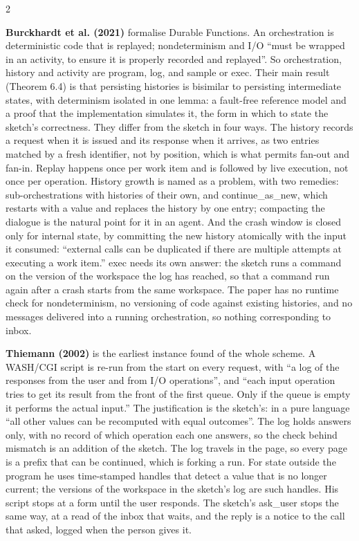 \documentclass{article}
\newcommand{\paper}[1]{\par\smallskip\textbf{#1}\quad}
\newcommand{\cd}[1]{{\ttfamily #1}}
\begin{document}
\begin{multicols}{2}
\paper{Burckhardt et al. (2021)} formalise Durable Functions. An orchestration is deterministic
code that is replayed; nondeterminism and I/O ``must be wrapped in an activity, to ensure it is
properly recorded and replayed''. So orchestration, history and activity are program, log, and
\cd{sample} or \cd{exec}. Their main result (Theorem 6.4) is that persisting histories is
bisimilar to persisting intermediate states, with determinism isolated in one lemma: a fault-free
reference model and a proof that the implementation simulates it, the form in which to state the
sketch's correctness. They differ from the sketch in four ways. The history records a request
when it is issued and its response when it arrives, as two entries matched by a fresh
identifier, not by position, which is what permits fan-out and fan-in. Replay happens once per
work item and is followed by live execution, not once per operation. History growth is named as
a problem, with two remedies: sub-orchestrations with histories of their own, and
\cd{continue\_as\_new}, which restarts with a value and replaces the history by one entry;
compacting the dialogue is the natural point for it in an agent. And the crash window is closed
only for internal state, by committing the new history atomically with the input it consumed:
``external calls can be duplicated if there are multiple attempts at executing a work item.''
\cd{exec} needs its own answer: the sketch runs a command on the version of the workspace the
log has reached, so that a command run again after a crash starts from the same workspace. The paper has no runtime check for nondeterminism, no
versioning of code against existing histories, and no messages delivered into a running
orchestration, so nothing corresponding to \cd{inbox}.

\paper{Thiemann (2002)} is the earliest instance found of the whole scheme. A WASH/CGI script is
re-run from the start on every request, with ``a log of the responses from the user and from I/O
operations'', and ``each input operation tries to get its result from the front of the first
queue. Only if the queue is empty it performs the actual input.'' The justification is the
sketch's: in a pure language ``all other values can be recomputed with equal outcomes''. The log
holds answers only, with no record of which operation each one answers, so the check behind
\cd{mismatch} is an addition of the sketch. The log travels in the page, so every page is a prefix
that can be continued, which is forking a run. For state outside the program he uses time-stamped
handles that detect a value that is no longer current; the versions of the workspace in the
sketch's log are such handles. His script stops at a form until the user responds. The
sketch's \cd{ask\_user} stops the same way, at a read of the inbox that waits, and the reply is a
notice to the call that asked, logged when the person gives it.


\end{multicols}
\end{document}
